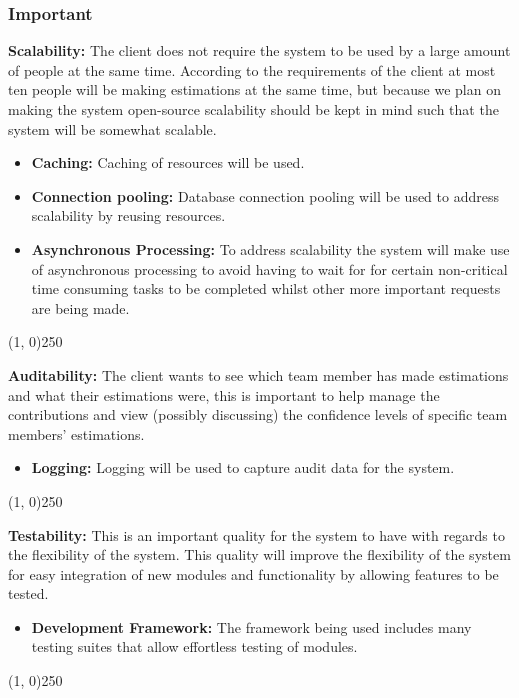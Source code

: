 \subsubsection{Important}
	{\bfseries Scalability:}
	The client does not require the system to be used by a large amount of people at the same time. According to the requirements of the client at most ten people will be making estimations at the same time, but because we plan on making the system open-source scalability should be kept in mind such that the system will be somewhat scalable.
		\begin{itemize}
			\item{\bfseries Caching:}
				Caching of resources will be used.
			\item{\bfseries Connection pooling:}
				Database connection pooling will be used to address scalability by reusing resources.
			\item{\bfseries Asynchronous Processing:}
				To address scalability the system will make use of asynchronous processing to avoid having to wait for for certain non-critical time consuming tasks to be completed whilst other more important requests are being made.
		\end{itemize}
		\begin{center}
		\line(1, 0){250}
		\end{center}
	{\bfseries Auditability:}
	The client wants to see which team member has made estimations and what their estimations were, this is important to help manage the contributions and view (possibly discussing) the confidence levels of specific team members' estimations.
	\begin{itemize}
		\item{\bfseries Logging:}
			Logging will be used to capture audit data for the system.
	\end{itemize}
	\begin{center}
	\line(1, 0){250}
	\end{center}
	{\bfseries Testability:}
	This is an important quality for the system to have with regards to the flexibility of the system. This quality will improve the flexibility of the system for easy integration of new modules and functionality by allowing features to be tested.
		\begin{itemize}
			\item{\bfseries Development Framework:}
				The framework being used includes many testing suites that allow effortless testing of modules.
		\end{itemize}
		\begin{center}
		\line(1, 0){250}
		\end{center}
